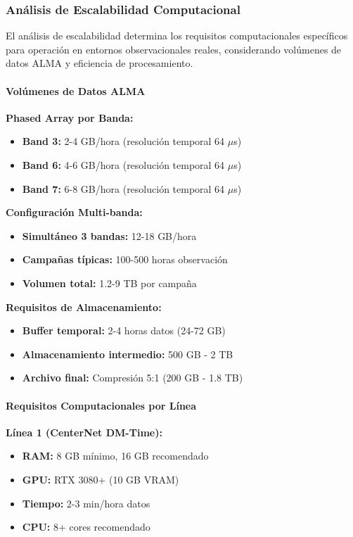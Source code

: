 \subsubsection{Análisis de Escalabilidad Computacional}

El análisis de escalabilidad determina los requisitos computacionales específicos para operación en entornos observacionales reales, considerando volúmenes de datos ALMA y eficiencia de procesamiento.

\paragraph{Volúmenes de Datos ALMA}

\textbf{Phased Array por Banda:}
\begin{itemize}
\item \textbf{Band 3:} 2-4 GB/hora (resolución temporal 64 $\mu$s)
\item \textbf{Band 6:} 4-6 GB/hora (resolución temporal 64 $\mu$s)
\item \textbf{Band 7:} 6-8 GB/hora (resolución temporal 64 $\mu$s)
\end{itemize}

\textbf{Configuración Multi-banda:}
\begin{itemize}
\item \textbf{Simultáneo 3 bandas:} 12-18 GB/hora
\item \textbf{Campañas típicas:} 100-500 horas observación
\item \textbf{Volumen total:} 1.2-9 TB por campaña
\end{itemize}

\textbf{Requisitos de Almacenamiento:}
\begin{itemize}
\item \textbf{Buffer temporal:} 2-4 horas datos (24-72 GB)
\item \textbf{Almacenamiento intermedio:} 500 GB - 2 TB
\item \textbf{Archivo final:} Compresión 5:1 (200 GB - 1.8 TB)
\end{itemize}

\paragraph{Requisitos Computacionales por Línea}

\textbf{Línea 1 (CenterNet DM-Time):}
\begin{itemize}
\item \textbf{RAM:} 8 GB mínimo, 16 GB recomendado
\item \textbf{GPU:} RTX 3080+ (10 GB VRAM)
\item \textbf{Tiempo:} 2-3 min/hora datos
\item \textbf{CPU:} 8+ cores recomendado
\end{itemize}

